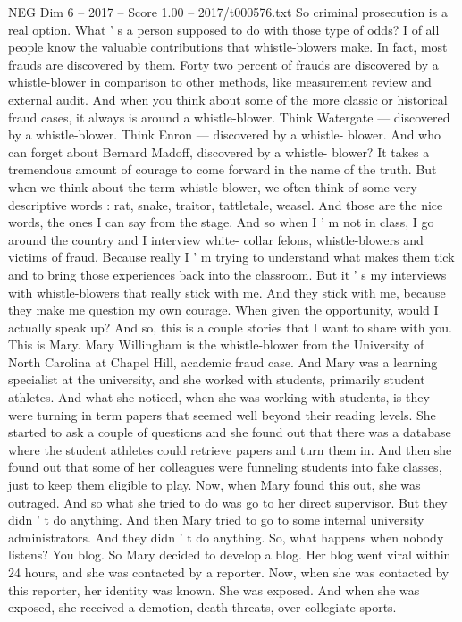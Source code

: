 \begin{textsample}{NEG Dim 6 – 2017 – Score 1.00 – 2017/t000576.txt}
So criminal prosecution is a real option.
What ' s a person supposed to do with those type of odds?
I of all people know the valuable contributions that whistle-blowers make.
In fact, most frauds are discovered by them.
Forty two percent of frauds are discovered by a whistle-blower in comparison to other methods, like measurement review and external audit.
And when you think about some of the more classic or historical fraud cases, it always is around a whistle-blower.
Think Watergate — discovered by a whistle-blower.
Think Enron — discovered by a whistle- blower.
And who can forget about Bernard Madoff, discovered by a whistle- blower?
It takes a tremendous amount of courage to come forward in the name of the truth.
But when we think about the term whistle-blower, we often think of some very descriptive words : rat, snake, traitor, tattletale, weasel.
And those are the nice words, the ones I can say from the stage.
And so when I ' m not in class, I go around the country and I interview white- collar felons, whistle-blowers and victims of fraud.
Because really I ' m trying to understand what makes them tick and to bring those experiences back into the classroom.
But it ' s my interviews with whistle-blowers that really stick with me.
And they stick with me, because they make me question my own courage.
When given the opportunity, would I actually speak up?
And so, this is a couple stories that I want to share with you.
This is Mary.
Mary Willingham is the whistle-blower from the University of North Carolina at Chapel Hill, academic fraud case.
And Mary was a learning specialist at the university, and she worked with students, primarily student athletes.
And what she noticed, when she was working with students, is they were turning in term papers that seemed well beyond their reading levels.
She started to ask a couple of questions and she found out that there was a database where the student athletes could retrieve papers and turn them in.
And then she found out that some of her colleagues were funneling students into fake classes, just to keep them eligible to play.
Now, when Mary found this out, she was outraged.
And so what she tried to do was go to her direct supervisor.
But they didn ' t do anything.
And then Mary tried to go to some internal university administrators.
And they didn ' t do anything.
So, what happens when nobody listens?
You blog.
So Mary decided to develop a blog.
Her blog went viral within 24 hours, and she was contacted by a reporter.
Now, when she was contacted by this reporter, her identity was known.
She was exposed.
And when she was exposed, she received a demotion, death threats, over collegiate sports.

\end{textsample}

